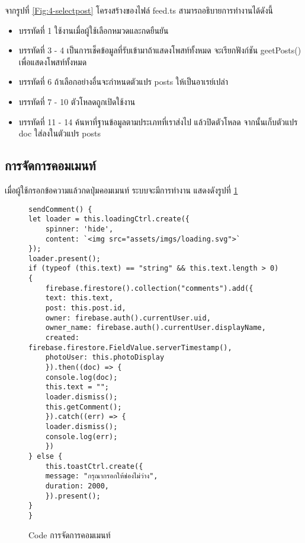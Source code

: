 จากรูปที่ \ref{Fig:4-selectpost} โครงสร้างของไฟล์ feed.ts สามารถอธิบายการทำงานได้ดังนี้
\begin{itemize}[label={--}]
\item บรรทัดที่ 1 ใช้งานเมื่อผู้ใช้เลือกหมวดและกดยืนยัน
\item บรรทัดที่ 3 - 4 เป็นการเช็คข้อมูลที่รับเข้ามาถ้าแสดงโพสท์ทั้งหมด จะเรียกฟังก์ชัน geetPosts() เพื่อแสดงโพสท์ทั้งหมด
\item บรรทัดที่ 6 ถ้าเลือกอย่างอื่นจะกำหนดตัวแปร posts ให้เป็นอาเรย์เปล่า
\item บรรทัดที่ 7 - 10 ตัวโหลดถูกเปิดใช้งาน
\item บรรทัดที่ 11 - 14 ค้นหาที่ฐานข้อมูลตามประเภทที่เราส่งไป แล้วปิดตัวโหลด จากนั้นเก็บตัวแปร doc ใส่ลงในตัวแปร posts
\end{itemize}
\newpage



\subsection{การจัดการคอมเมนท์}
เมื่อผู้ใช้กรอกข้อความแล้วกดปุ่มคอมเมนท์ ระบบจะมีการทำงาน แสดงดังรูปที่ \ref{Fig:4-commentspost}

\begin{figure}[H]
{\lstset{language=Pascal}
\begin{lstlisting}
sendComment() {
let loader = this.loadingCtrl.create({
	spinner: 'hide',
	content: `<img src="assets/imgs/loading.svg">`
});
loader.present();
if (typeof (this.text) == "string" && this.text.length > 0) {
	firebase.firestore().collection("comments").add({
	text: this.text,
	post: this.post.id,
	owner: firebase.auth().currentUser.uid,
	owner_name: firebase.auth().currentUser.displayName,
	created: firebase.firestore.FieldValue.serverTimestamp(),
	photoUser: this.photoDisplay
	}).then((doc) => {
	console.log(doc);
	this.text = "";
	loader.dismiss();
	this.getComment();
	}).catch((err) => {
	loader.dismiss();
	console.log(err);
	})
} else {
	this.toastCtrl.create({
	message: "กรุณากรอกให้ช่องไม่ว่าง",
	duration: 2000,
	}).present();
}
}
\end{lstlisting}}
\caption{Code การจัดการคอมเมนท์}
\label{Fig:4-commentspost}
\end{figure}
\newpage

